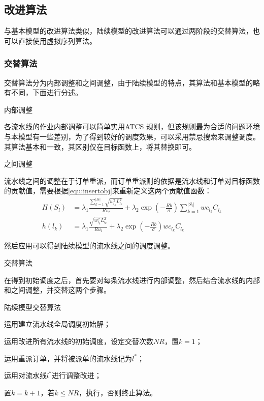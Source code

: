 \subsection{改进算法}
与基本模型的改进算法类似，陆续模型的改进算法可以通过两阶段的交替算法，也可以直接使用虚拟序列算法。
\subsubsection{交替算法}
交替算法分为内部调整和之间调整，由于陆续模型的特点，其算法和基本模型的略有不同，下面进行分述。
\begin{asparaenum}
\item 内部调整

各流水线的作业内部调整可以简单实用ATCS 规则，但该规则最为合适的问题环境与本模型有一些差别，为了得到较好的调度效果，可以采用禁忌搜索来调整调度。其算法基本和一致，其区别仅在目标函数上，将其替换即可。

\item 之间调整

流水线之间的调整在于订单重派，而订单重派则的依据是流水线和订单对目标函数的贡献值，需要根据\eqref{equ:insertobj}来重新定义这两个贡献值函数：
\begin{align}
H(S_l) &= \lambda_1\frac{\sum_{k=1}^{|S_l|}\sqrt{w_{l_k}^2L_{l_k}^2}}{Ru_l} + \lambda_2 \exp\left(-\frac{Rb}{\sigma}\right)\sum_{k=1}^{|S_l|}wc_{l_k}C_{l_k}\label{equ:lineinsertfunct}\\
h(l_k) &= \lambda_1\frac{\sqrt{w_{l_k}^2L_{l_k}^2}}{Ru_l} + \lambda_2 \exp\left(-\frac{Rb}{\sigma}\right)wc_{l_k}C_{l_k}
\label{equ:iteminsertfunct}
\end{align}

然后应用可以得到陆续模型的流水线之间的调度调整。
\item 交替算法
\end{asparaenum}

在得到初始调度之后，首先要对每条流水线进行内部调整，然后结合流水线的内部和之间调整，并交替这两个步骤。
\begin{algori}
陆续模型交替算法\label{alg:inturncontinue}
\begin{asparaenum}
\renewcommand{\labelenumi}{\bf Step\theenumi~}
\item 运用建立流水线全局调度初始解；
\item 运用改进所有流水线的初始调度，设定交替次数$NR$，置$k = 1$；
\item 运用重派订单，并将被派单的流水线记为$l^*$；
\item 运用对流水线$l^*$进行调整改进；
\item 置$k = k+1$，若$k\le NR$，执行，否则终止算法。
\end{asparaenum}
\end{algori}

